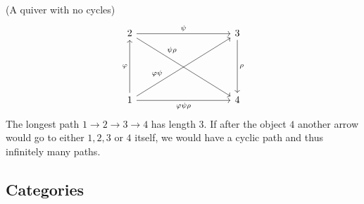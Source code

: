 \begin{example}{(A quiver with no cycles)}\\
\[
\begin{tikzcd}
2 \arrow[rrrr, "\psi"] \arrow[rrrrddd, "\psi\rho", pos=0.3] &  &  &  &
3 \arrow[ddd, "\rho"] \\
 &  &  &  & \\
 &  &  &  & \\
1 \arrow[uuu, "\varphi"] \arrow[rrrruuu, "\varphi\psi", pos=0.3] \arrow[rrrr, "\varphi\psi\rho" '] &  &  &  & 4
\end{tikzcd}
\]
The longest path $1\rightarrow2\rightarrow3\rightarrow4$ has length 3. If after the object $4$ another arrow would go to either $1,2,3$ or $4$ itself,
we would have a cyclic path and thus infinitely many paths.
\end{example}

\subsection{Categories}

